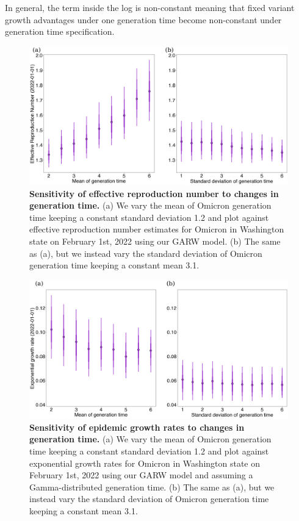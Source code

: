 \documentclass[11pt,oneside,letterpaper]{article}
\begin{document}
In general, the term inside the log is non-constant meaning that fixed variant growth advantages under one generation time become non-constant under generation time specification.

\begin{figure}
  \centering
  \includegraphics[width=\linewidth]{figs/generation_time_sensitivity.png}
  \caption{\textbf{Sensitivity of effective reproduction number to changes in generation time.} 
(a) We vary the mean of Omicron generation time keeping a constant standard deviation 1.2 and plot against effective reproduction number estimates for Omicron in Washington state on February 1st, 2022 using our GARW model.
(b) The same as (a), but we instead vary the standard deviation of Omicron generation time keeping a constant mean 3.1.}%
  \label{fig:generation_time_sensitivity}
\end{figure}

\begin{figure}
  \centering
  \includegraphics[width=\linewidth]{figs/little_r_sensitivity.png}
  \caption{\textbf{Sensitivity of epidemic growth rates to changes in generation time.} 
(a) We vary the mean of Omicron generation time keeping a constant standard deviation 1.2 and plot against exponential growth rates for Omicron in Washington state on February 1st, 2022 using our GARW model and assuming a Gamma-distributed generation time.
(b) The same as (a), but we instead vary the standard deviation of Omicron generation time keeping a constant mean 3.1. }%
  \label{fig:little_r_sensitivity}
\end{figure}
\end{document}
